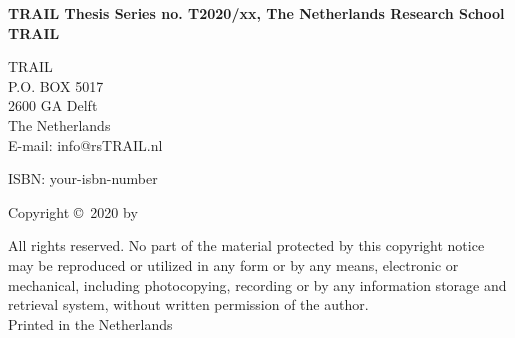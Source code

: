 \begin{small}
\bigskip{}
\noindent\textbf{TRAIL Thesis Series no. T2020/xx, The Netherlands Research School TRAIL}\\
\smallskip{}

\noindent TRAIL\\
P.O. BOX 5017\\
2600 GA Delft\\
The Netherlands\\
E-mail: info@rsTRAIL.nl\\
\bigskip{}

\noindent ISBN: your-isbn-number\\
\smallskip{}

\noindent Copyright \copyright~2020 by \theauthor\\
\smallskip{}

\noindent All rights reserved. No part of the material protected by this copyright notice may be reproduced or utilized in any form or by any means, electronic or mechanical, including photocopying, recording or by any information storage and retrieval system, without written permission of the author.
\\

\noindent Printed in the Netherlands

\end{small}

